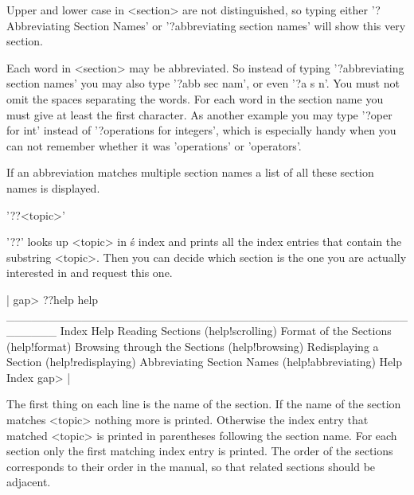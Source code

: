 %

Upper and lower case in <section> are not distinguished, so typing either
'?Abbreviating Section Names' or '?abbreviating section names' will  show
this very section.

Each  word  in  <section>  may be  abbreviated.   So  instead  of  typing
'?abbreviating section names'  you may also type '?abb sec nam',  or even
'?a s n'.  You  must not omit the spaces separating  the words.  For each
word in the section name you must  give at least the first character.  As
another example you may  type '?oper for int' instead of '?operations for
integers', which is especially handy when you can not remember whether it
was 'operations' or 'operators'.

If an abbreviation matches multiple   section names a   list of all these
section names is displayed.

%

'??<topic>'

'??' looks up <topic> in {\GAP}\'s index and prints all the index entries
that contain the substring <topic>.  Then you can decide which section is
the one you are actually interested in and request this one.

|    gap> ??help
        help ______________________________________________________ Index
        Help
        Reading Sections (help!scrolling)
        Format of the Sections (help!format)
        Browsing through the Sections (help!browsing)
        Redisplaying a Section (help!redisplaying)
        Abbreviating Section Names (help!abbreviating)
        Help Index
    gap> |

The first thing on each line is the name of the  section.  If the name of
the section matches <topic> nothing more is printed.  Otherwise the index
entry  that matched   <topic>  is printed   in  parentheses following the
section name.  For  each section only  the first matching index entry  is
printed.  The  order  of the sections corresponds  to  their order in the
{\GAP} manual, so that related sections should be adjacent.

%
%

